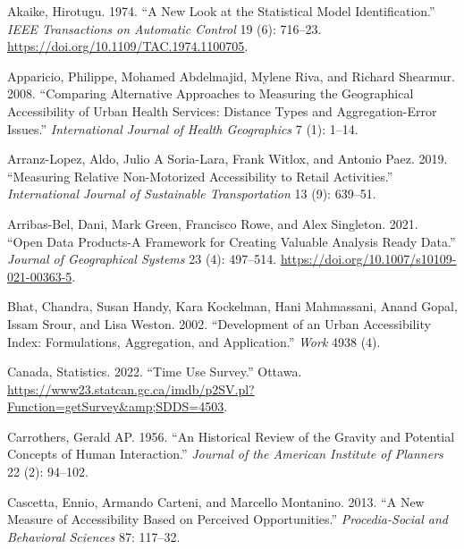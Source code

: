 \documentclass[preprint, 3p,
authoryear]{elsarticle} %
\newlength{\cslhangindent}
\newlength{\cslentryspacingunit} %
\newenvironment{CSLReferences}[2] %
 {%
  \setlength{\parindent}{0pt}
  \ifodd #1
  \let\oldpar\par
  \def\par{\hangindent=\cslhangindent\oldpar}
  \fi
  \setlength{\parskip}{#2\cslentryspacingunit}
 }%
 {}
\begin{document}
\hypertarget{refs}{}
\begin{CSLReferences}{1}{0}
\leavevmode{}%
Akaike, Hirotugu. 1974. {``A New Look at the Statistical Model
Identification.''} \emph{IEEE Transactions on Automatic Control} 19 (6):
716--23. \url{https://doi.org/10.1109/TAC.1974.1100705}.

\leavevmode{}%
Apparicio, Philippe, Mohamed Abdelmajid, Mylene Riva, and Richard
Shearmur. 2008. {``Comparing Alternative Approaches to Measuring the
Geographical Accessibility of Urban Health Services: Distance Types and
Aggregation-Error Issues.''} \emph{International Journal of Health
Geographics} 7 (1): 1--14.

\leavevmode{}%
Arranz-Lopez, Aldo, Julio A Soria-Lara, Frank Witlox, and Antonio Paez.
2019. {``Measuring Relative Non-Motorized Accessibility to Retail
Activities.''} \emph{International Journal of Sustainable
Transportation} 13 (9): 639--51.

\leavevmode{}%
Arribas-Bel, Dani, Mark Green, Francisco Rowe, and Alex Singleton. 2021.
{``Open Data Products-A Framework for Creating Valuable Analysis Ready
Data.''} \emph{Journal of Geographical Systems} 23 (4): 497--514.
\url{https://doi.org/10.1007/s10109-021-00363-5}.

\leavevmode{}%
Bhat, Chandra, Susan Handy, Kara Kockelman, Hani Mahmassani, Anand
Gopal, Issam Srour, and Lisa Weston. 2002. {``Development of an Urban
Accessibility Index: Formulations, Aggregation, and Application.''}
\emph{Work} 4938 (4).

\leavevmode{}%
Canada, Statistics. 2022. {``Time Use Survey.''} Ottawa.
\url{https://www23.statcan.gc.ca/imdb/p2SV.pl?Function=getSurvey\&amp;SDDS=4503}.

\leavevmode{}%
Carrothers, Gerald AP. 1956. {``An Historical Review of the Gravity and
Potential Concepts of Human Interaction.''} \emph{Journal of the
American Institute of Planners} 22 (2): 94--102.

\leavevmode{}%
Cascetta, Ennio, Armando Carteni, and Marcello Montanino. 2013. {``A New
Measure of Accessibility Based on Perceived Opportunities.''}
\emph{Procedia-Social and Behavioral Sciences} 87: 117--32.


\end{CSLReferences}
\end{document}
